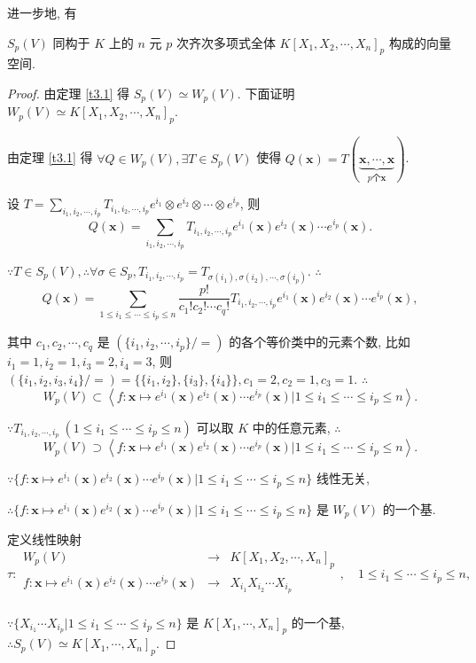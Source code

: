 \documentclass{ctexart}
\begin{document}
进一步地, 有
\begin{theorem}\label{t3.2}
    $S_p(V)$ 同构于 $K$ 上的 $n$ 元 $p$ 次齐次多项式全体 $K[X_1,X_2,\cdots,X_n]_p$ 构成的向量空间.
\end{theorem}
\begin{proof}
    由定理 \ref{t3.1} 得 $S_p(V)\simeq W_p(V)$. 下面证明 $W_p(V)\simeq K[X_1,X_2,\cdots,X_n]_p$.

    由定理 \ref{t3.1} 得 $\forall Q\in W_p(V),\exists T\in S_p(V)$ 使得 $Q(\boldsymbol{x})=T(\underbrace{\boldsymbol{x},\cdots,\boldsymbol{x}}_{p\text{个}\boldsymbol{x}})$.

    设 $T=\sum\limits_{i_1,i_2,\cdots,i_p}T_{i_1,i_2,\cdots,i_p}e^{i_1}\otimes e^{i_2}\otimes\cdots\otimes e^{i_p}$, 则
    \[Q(\boldsymbol{x})=\sum\limits_{i_1,i_2,\cdots,i_p}T_{i_1,i_2,\cdots,i_p}e^{i_1}(\boldsymbol{x})e^{i_2}(\boldsymbol{x})\cdots e^{i_p}(\boldsymbol{x}).\]

    $\because T\in S_p(V),\therefore\forall\sigma\in S_p,T_{i_1,i_2,\cdots,i_p}=T_{\sigma(i_1),\sigma(i_2),\cdots,\sigma(i_p)}$. $\therefore$
    \[Q(\boldsymbol{x})=\sum\limits_{1\leq i_1\leq\cdots\leq i_p\leq n}\dfrac{p!}{c_1!c_2!\cdots c_q!}T_{i_1,i_2,\cdots,i_p}e^{i_1}(\boldsymbol{x})e^{i_2}(\boldsymbol{x})\cdots e^{i_p}(\boldsymbol{x}),\]

    其中 $c_1,c_2,\cdots,c_q$ 是 $(\{i_1,i_2,\cdots,i_p\}/=)$ 的各个等价类中的元素个数, 比如 $i_1=1,i_2=1,i_3=2,i_4=3$, 则 $(\{i_1,i_2,i_3,i_4\}/=)=\{\{i_1,i_2\},\{i_3\},\{i_4\}\},c_1=2,c_2=1,c_3=1$. $\therefore$
    \[W_p(V)\subset\left<f:\boldsymbol{x}\mapsto e^{i_1}(\boldsymbol{x})e^{i_2}(\boldsymbol{x})\cdots e^{i_p}(\boldsymbol{x})|1\leq i_1\leq\cdots\leq i_p\leq n\right>.\]

    $\because T_{i_1,i_2,\cdots,i_p}\ (1\leq i_1\leq\cdots\leq i_p\leq n)$ 可以取 $K$ 中的任意元素, $\therefore$
    \[W_p(V)\supset\left<f:\boldsymbol{x}\mapsto e^{i_1}(\boldsymbol{x})e^{i_2}(\boldsymbol{x})\cdots e^{i_p}(\boldsymbol{x})|1\leq i_1\leq\cdots\leq i_p\leq n\right>.\]

    $\because\{f:\boldsymbol{x}\mapsto e^{i_1}(\boldsymbol{x})e^{i_2}(\boldsymbol{x})\cdots e^{i_p}(\boldsymbol{x})|1\leq i_1\leq\cdots\leq i_p\leq n\}$ 线性无关,
    
    $\therefore\{f:\boldsymbol{x}\mapsto e^{i_1}(\boldsymbol{x})e^{i_2}(\boldsymbol{x})\cdots e^{i_p}(\boldsymbol{x})|1\leq i_1\leq\cdots\leq i_p\leq n\}$ 是 $W_p(V)$ 的一个基.

    定义线性映射
    \[\tau:\begin{array}{rcl}
        W_p(V) & \rightarrow & K[X_1,X_2,\cdots,X_n]_p \\
        f:\boldsymbol{x}\mapsto e^{i_1}(\boldsymbol{x})e^{i_2}(\boldsymbol{x})\cdots e^{i_p}(\boldsymbol{x}) & \rightarrow & X_{i_1}X_{i_2}\cdots X_{i_p} \\
    \end{array},\quad1\leq i_1\leq\cdots\leq i_p\leq n,\]

    $\because\{X_{i_1}\cdots X_{i_p}|1\leq i_1\leq\cdots\leq i_p\leq n\}$ 是 $K[X_1,\cdots,X_n]_p$ 的一个基, $\therefore S_p(V)\simeq K[X_1,\cdots,X_n]_p$.
\end{proof}
\end{document}
